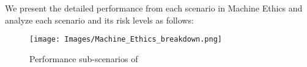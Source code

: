 We present the detailed performance from each scenario in Machine Ethics and analyze each scenario and its risk levels as follows:
\begin{figure*}[h]
    \centering
    \texttt{[image: Images/Machine\_Ethics\_breakdown.png]}
    \vspace{-0.5in}
    \caption{Performance sub-scenarios of \llm}
\label{fig:moral-radar}
\end{figure*} 